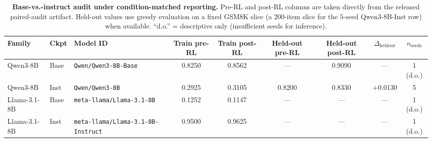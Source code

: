 \begin{table}[t]
\centering
\caption{\textbf{Base-vs.-instruct audit under condition-matched reporting.}
Pre-RL and post-RL columns are taken directly from the released paired-audit
artifact. Held-out values use greedy evaluation on a fixed GSM8K slice (a $200$-item
slice for the $5$-seed Qwen3-8B-Inst row) when available. ``d.o.'' = descriptive
only (insufficient seeds for inference).}
\label{tab:paired-bi}
\small
\begin{tabular}{@{}l l l c c c c c c@{}}
\toprule
\textbf{Family} & \textbf{Ckpt} & \textbf{Model ID} &
\textbf{Train pre-RL} & \textbf{Train post-RL} &
\textbf{Held-out pre-RL} & \textbf{Held-out post-RL} &
\textbf{$\Delta_{\mathrm{heldout}}$} & \textbf{$n_{\text{seeds}}$} \\
\midrule
Qwen3-8B     & Base & \texttt{Qwen/Qwen3-8B-Base}      & 0.8250 & 0.8562 & ---    & 0.9090 & ---     & 1 (d.o.) \\
Qwen3-8B     & Inst & \texttt{Qwen/Qwen3-8B}           & 0.2925 & 0.3105 & 0.8200 & 0.8330 & +0.0130 & 5 \\
Llama-3.1-8B & Base & \texttt{meta-llama/Llama-3.1-8B} & 0.1252 & 0.1147 & ---    & ---    & ---     & 1 (d.o.) \\
Llama-3.1-8B & Inst & \texttt{meta-llama/Llama-3.1-8B-Instruct} & 0.9500 & 0.9625 & --- & --- & --- & 1 (d.o.) \\
\bottomrule
\end{tabular}
\end{table}

